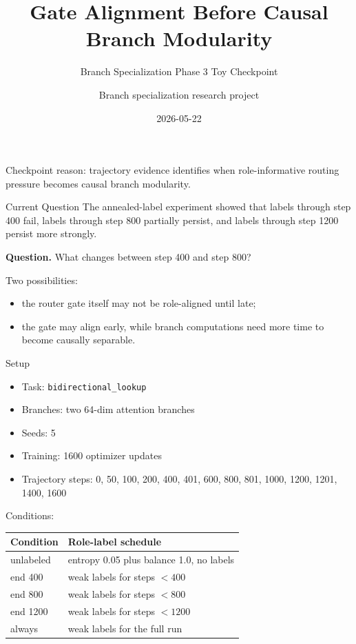 \documentclass[aspectratio=169]{beamer}
\title[Router Trajectories]{Gate Alignment Before Causal Branch Modularity}
\subtitle{Branch Specialization Phase 3 Toy Checkpoint}
\author{Branch specialization research project}
\date{2026-05-22}
\begin{document}
\begin{frame}
  \titlepage
  \vspace{-0.5em}
  \small
  Checkpoint reason: trajectory evidence identifies when role-informative
  routing pressure becomes causal branch modularity.
\end{frame}

\begin{frame}{Current Question}
  The annealed-label experiment showed that labels through step 400 fail, labels
  through step 800 partially persist, and labels through step 1200 persist more
  strongly.

  \vspace{0.8em}
  \textbf{Question.} What changes between step 400 and step 800?

  \vspace{0.8em}
  Two possibilities:
  \begin{itemize}
    \item the router gate itself may not be role-aligned until late;
    \item the gate may align early, while branch computations need more time to
    become causally separable.
  \end{itemize}
\end{frame}

\begin{frame}{Setup}
  \begin{itemize}
    \item Task: \texttt{bidirectional\_lookup}
    \item Branches: two 64-dim attention branches
    \item Seeds: 5
    \item Training: 1600 optimizer updates
    \item Trajectory steps: 0, 50, 100, 200, 400, 401, 600, 800, 801, 1000,
    1200, 1201, 1400, 1600
  \end{itemize}

  \vspace{0.5em}
  Conditions:
  \begin{center}
  \begin{tabular}{ll}
    \toprule
    Condition & Role-label schedule \\
    \midrule
    unlabeled & entropy 0.05 plus balance 1.0, no labels \\
    end 400 & weak labels for steps $<400$ \\
    end 800 & weak labels for steps $<800$ \\
    end 1200 & weak labels for steps $<1200$ \\
    always & weak labels for the full run \\
    \bottomrule
  \end{tabular}
  \end{center}
\end{frame}
\end{document}
